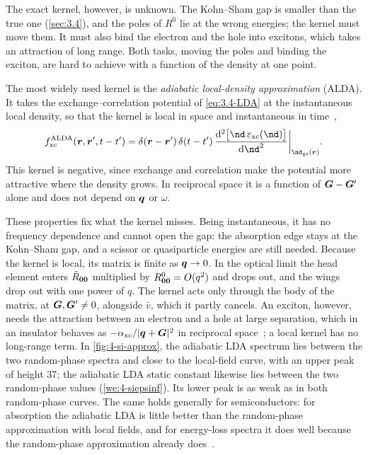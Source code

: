 The exact kernel, however, is unknown. The Kohn--Sham gap is smaller than the true one (\cref{sec:3.4}), and the poles of $R^0$ lie at the wrong energies; the kernel must move them. It must also bind the electron and the hole into excitons, which takes an attraction of long range. Both tasks, moving the poles and binding the exciton, are hard to achieve with a function of the density at one point.

The most widely used kernel is the \emph{adiabatic local-density approximation} (ALDA). It takes the exchange--correlation potential of \cref{eq:3.4-LDA} at the instantaneous local density, so that the kernel is local in space and instantaneous in time~\cite{gross1985local},
\begin{equation}
  f_{\mathrm{xc}}^{\mathrm{ALDA}}(\vect{r},\vect{r}',t - t') = \delta(\vect{r} - \vect{r}')\,\delta(t - t')\,\frac{\dd^2\bigl[\nd\,\varepsilon_{\mathrm{xc}}(\nd)\bigr]}{\dd\nd^2}\bigg|_{\nd_{\mathrm{gs}}(\vect{r})} .
  \label{eq:4.6-alda}
\end{equation}
This kernel is negative, since exchange and correlation make the potential more attractive where the density grows. In reciprocal space it is a function of $\bm{G} - \bm{G}'$ alone and does not depend on $\bm{q}$ or $\omega$.

These properties fix what the kernel misses. Being instantaneous, it has no frequency dependence and cannot open the gap: the absorption edge stays at the Kohn--Sham gap, and a scissor or quasiparticle energies are still needed. Because the kernel is local, its matrix is finite as $\bm{q} \to 0$. In the optical limit the head element enters $\tilde R_{\bm{0}\bm{0}}$ multiplied by $R^0_{\bm{0}\bm{0}} = O(q^2)$ and drops out, and the wings drop out with one power of $q$. The kernel acts only through the body of the matrix, at $\bm{G}, \bm{G}' \neq 0$, alongside $\bar v$, which it partly cancels. An exciton, however, needs the attraction between an electron and a hole at large separation, which in an insulator behaves as $-\alpha_{\mathrm{xc}}/|\bm{q}+\bm{G}|^2$ in reciprocal space~\cite{reining2002excitonic}; a local kernel has no long-range term. In \cref{fig:4-si-approx}, the adiabatic LDA spectrum lies between the two random-phase spectra and close to the local-field curve, with an upper peak of height 37; the adiabatic LDA static constant likewise lies between the two random-phase values (\cref{we:4-siepsinf}). Its lower peak is as weak as in both random-phase curves. The same holds generally for semiconductors: for absorption the adiabatic LDA is little better than the random-phase approximation with local fields, and for energy-loss spectra it does well because the random-phase approximation already does~\cite{onida2002electronic,botti2007time}.

